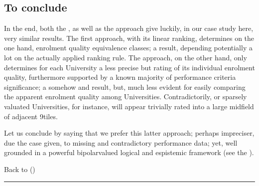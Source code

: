 \documentclass[a4paper,12pt,english]{sphinxhowto}
\begin{document}
\subsection{To conclude}
\label{\detokenize{tutorial:to-conclude}}
In the end, both the  , as well as the  approach give luckily, in our case study here, very similar results. The first approach, with its  linear ranking, determines on the one hand,  enrolment quality equivalence classes; a result, depending potentially a lot on the actually applied ranking rule. The  approach, on the other hand, only determines for each University a less precise but  rating of its individual enrolment quality, furthermore supported by a known majority of performance criteria significance; a somehow  and  result, but, much less evident for easily comparing the apparent enrolment quality among Universities. Contradictorily, or sparsely valuated Universities, for instance, will appear trivially rated into a large midfield of adjacent 9\sphinxhyphen{}tiles.

Let us conclude by saying that we prefer this latter  approach; perhaps impreciser, due the case given, to missing and contradictory performance data; yet, well grounded in a powerful bipolar\sphinxhyphen{}valued logical and espistemic framework (see the ).

Back to {\hyperref[\detokenize{tutorial:tutorial-label}]{}} ()


\bigskip\hrule\bigskip
\end{document}
